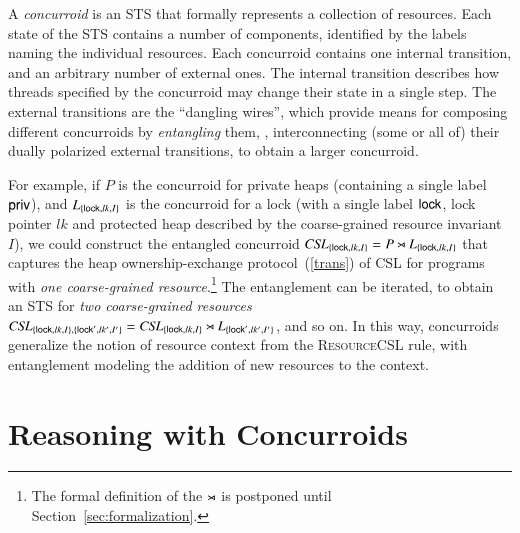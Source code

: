 A \emph{concurroid} is an STS that formally represents a collection of
resources. Each state of the STS contains a number of components,
identified by the labels naming the individual resources. Each
concurroid contains one internal transition, and an arbitrary number
of external ones. The internal transition describes how threads
specified by the concurroid may change their state in a single step. 
%
%
The external transitions are the ``dangling wires'', which provide
means for composing different concurroids by \emph{entangling} them,
\ie, interconnecting (some or all of) their dually polarized external
transitions, to obtain a larger concurroid.

For example, if $P$ is the concurroid for private heaps (containing a
single label $\mathsf{priv}$), and $L_{\{\mathsf{lock},lk,I\}}$ is the concurroid
for a lock (with a single label $\mathsf{lock}$, lock pointer $lk$ and
protected heap described by the coarse-grained resource invariant
$I$), we could construct the entangled concurroid
$\textit{CSL}_{\{\mathsf{lock},lk,I\}} = P \rtimes L_{\{\mathsf{lock},lk,I\}}$ that
captures the heap ownership-exchange protocol~(\ref{trans}) of CSL for
programs with \emph{one coarse-grained resource}.\footnote{The formal
  definition of the $\rtimes$ is postponed until
  Section~\ref{sec:formalization}.}  The entanglement can be iterated,
to obtain an STS for \emph{two coarse-grained resources}
$\textit{CSL}_{\{\mathsf{lock}, lk, I\}, \{\mathsf{lock}', lk',I'\}} =
\textit{CSL}_{\{\mathsf{lock},lk,I\}} \rtimes L_{\{\mathsf{lock}',lk',I'\}}$, and so on.
%
In this way, concurroids generalize the notion of resource context
from the \textsc{ResourceCSL} rule, with entanglement modeling the
addition of new resources to the context.



\section{Reasoning with Concurroids}
\label{sec:reasoning}
%
%
